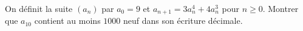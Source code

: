 On définit la suite $(a_n)$ par $a_0 = 9$ et $a_{n+1} = 3a_n^4 + 4a_n^3$ pour $n \geq 0$. Montrer que $a_{10}$ contient au moins $1000$ neuf dans son écriture décimale.
